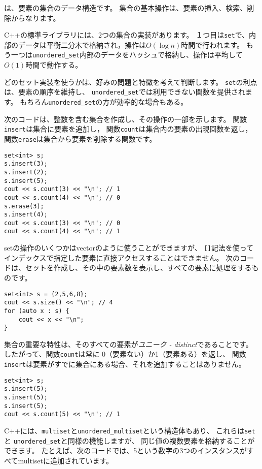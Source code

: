 は、要素の集合のデータ構造です。
集合の基本操作は、要素の挿入、検索、削除からなります。

C++の標準ライブラリには、2つの集合の実装があります。
１つ目は\texttt{set}で、内部のデータは平衡二分木で格納され，操作は$O(\log n)$時間で行われます。
もう一つは\texttt{unordered\_set}内部のデータをハッシュで格納し、操作は平均して$O(1)$時間で動作する。

どのセット実装を使うかは、好みの問題と特徴を考えて判断します。
\texttt{set}の利点は、要素の順序を維持し、
\texttt{unordered\_set}では利用できない関数を提供されます。
もちろん\texttt{unordered\_set}の方が効率的な場合もある。

次のコードは、整数を含む集合を作成し、その操作の一部を示します。
関数\texttt{insert}は集合に要素を追加し，
関数\texttt{count}は集合内の要素の出現回数を返し，
関数\texttt{erase}は集合から要素を削除する関数です。

\begin{lstlisting}
set<int> s;
s.insert(3);
s.insert(2);
s.insert(5);
cout << s.count(3) << "\n"; // 1
cout << s.count(4) << "\n"; // 0
s.erase(3);
s.insert(4);
cout << s.count(3) << "\n"; // 0
cout << s.count(4) << "\n"; // 1
\end{lstlisting}

setの操作のいくつかはvectorのように使うことができますが、
\texttt{[]}記法を使ってインデックスで指定した要素に直接アクセスすることはできません。
次のコードは、セットを作成し、その中の要素数を表示し、すべての要素に処理をするものです。
\begin{lstlisting}
set<int> s = {2,5,6,8};
cout << s.size() << "\n"; // 4
for (auto x : s) {
    cout << x << "\n";
}
\end{lstlisting}

集合の重要な特性は、そのすべての要素が\emph{ユニーク - distinct}であることです。
したがって、関数\texttt{count}は常に
0（要素ない）か1（要素ある）を返し、
関数\texttt{insert}は要素がすでに集合にある場合、それを追加することはありません。
\begin{lstlisting}
set<int> s;
s.insert(5);
s.insert(5);
s.insert(5);
cout << s.count(5) << "\n"; // 1
\end{lstlisting}

C++には、\texttt{multiset}と\texttt{unordered\_multiset}という構造体もあり、
これらは\texttt{set} と \texttt{unordered\_set}と同様の機能しますが、
同じ値の複数要素を格納することができます。
たとえば、次のコードでは、5という数字の3つのインスタンスがすべてmultisetに追加されています。

